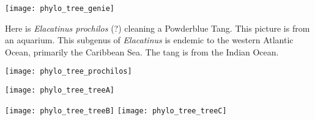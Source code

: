 \documentclass[11pt, addpoints]{exam}
\begin{document}
\begin{center}
	\texttt{[image: phylo\_tree\_genie]}
\end{center}

\vspace*{1\baselineskip}

\noindent Here is \emph{Elacatinus prochilos} (?) cleaning a Powderblue Tang.
This picture is from an aquarium. This subgenus of \emph{Elacatinus} is
endemic to the western Atlantic Ocean, primarily the Caribbean Sea. The
tang is from the Indian Ocean.

\begin{center}
	\texttt{[image: phylo\_tree\_prochilos]}
\end{center}

\newpage

\texttt{[image: phylo\_tree\_treeA]}\label{treeA}

\newpage

\begin{landscape}

\texttt{[image: phylo\_tree\_treeB]}\label{two_trees}%
\hfill\texttt{[image: phylo\_tree\_treeC]}

\end{landscape}
\end{document}
